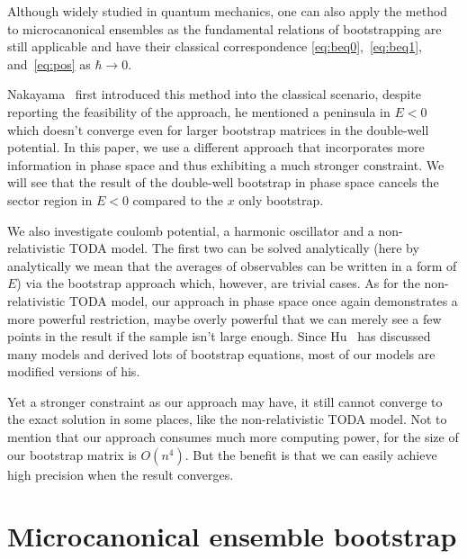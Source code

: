 \documentclass[aps, preprint,amsmath, amssymb]{revtex4-2}
\begin{document}
Although widely studied in quantum mechanics, one can also apply the method to microcanonical ensembles as the fundamental relations of bootstrapping are still applicable and have their classical correspondence \eqref{eq:beq0},~\eqref{eq:beq1}, and~\eqref{eq:pos} as $\hbar \to 0$.

Nakayama~\cite{Nakayama_2022} first introduced this method into the classical scenario, despite reporting the feasibility of the approach, he mentioned a peninsula in $ E < 0$ which doesn't converge even for larger bootstrap matrices in the double-well potential. In this paper, we use a different approach that incorporates more information in phase space and thus exhibiting a much stronger constraint. We will see that the result of the double-well bootstrap in phase space cancels the sector region in $E < 0$ compared to the $x$ only bootstrap.

We also investigate coulomb potential, a harmonic oscillator and a non-relativistic TODA model. The first two can be solved analytically (here by analytically we mean that the averages of observables can be written in a form of $E$) via the bootstrap approach which, however, are trivial cases. As for the non-relativistic TODA model, our approach in phase space once again demonstrates a more powerful restriction, maybe overly powerful that we can merely see a few points in the result if the sample isn't large enough.
Since Hu~\cite{Hu:2022keu} has discussed many models and derived lots of bootstrap equations, most of our models are modified versions of his.

Yet a stronger constraint as our approach may have, it still cannot converge to the exact solution in some places, like the non-relativistic TODA model. Not to mention that our approach consumes much more computing power, for the size of our bootstrap matrix is ${O}(n^4)$. But the benefit is that we can easily achieve high precision when the result converges.

\section{Microcanonical ensemble bootstrap}
\end{document}
